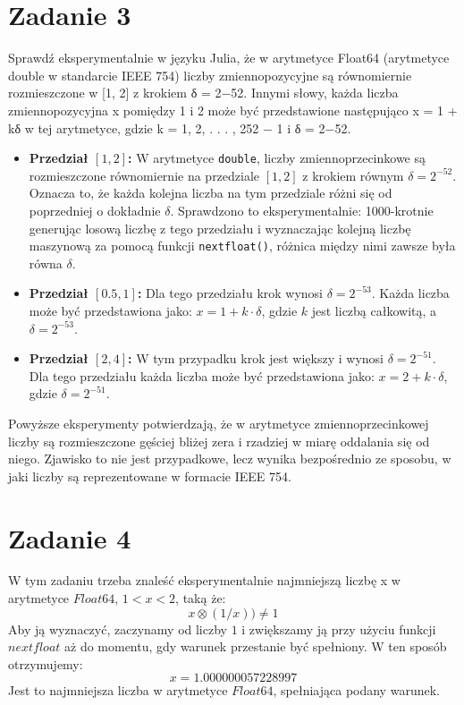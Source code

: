 \documentclass{article}
\begin{document}
\section*{Zadanie 3}

Sprawdź eksperymentalnie w języku Julia, że w arytmetyce Float64 (arytmetyce double
w standarcie IEEE 754) liczby zmiennopozycyjne są równomiernie rozmieszczone w [1, 2] z
krokiem δ = 2−52. Innymi słowy, każda liczba zmiennopozycyjna x pomiędzy 1 i 2 może
być przedstawione następująco x = 1 + kδ w tej arytmetyce, gdzie k = 1, 2, . . . , 252 − 1 i
δ = 2−52.

\begin{itemize}
    \item \textbf{Przedział \([1, 2]\):} W arytmetyce \texttt{double}, liczby zmiennoprzecinkowe są rozmieszczone równomiernie na przedziale \([1, 2]\) z krokiem równym $\delta = 2^{-52}$. Oznacza to, że każda kolejna liczba na tym przedziale różni się od poprzedniej o dokładnie $\delta$. Sprawdzono to eksperymentalnie: 1000-krotnie generując losową liczbę z tego przedziału i wyznaczając kolejną liczbę maszynową za pomocą funkcji \texttt{nextfloat()}, różnica między nimi zawsze była równa $\delta$.

    \item \textbf{Przedział \([0.5, 1]\):} Dla tego przedziału krok wynosi $\delta = 2^{-53}$. Każda liczba może być przedstawiona jako: $x = 1 + k \cdot \delta$, gdzie $k$ jest liczbą całkowitą, a $\delta = 2^{-53}$.

    \item \textbf{Przedział \([2, 4]\):} W tym przypadku krok jest większy i wynosi $\delta = 2^{-51}$. Dla tego przedziału każda liczba może być przedstawiona jako: $x = 2 + k \cdot \delta$, gdzie $\delta = 2^{-51}$.
\end{itemize}

Powyższe eksperymenty potwierdzają, że w arytmetyce zmiennoprzecinkowej liczby są rozmieszczone gęściej bliżej zera i rzadziej w miarę oddalania się od niego. Zjawisko to nie jest przypadkowe, lecz wynika bezpośrednio ze sposobu, w jaki liczby są reprezentowane w formacie IEEE 754.
\section*{Zadanie 4}
W tym zadaniu trzeba znaleść eksperymentalnie najmniejszą liczbę x w arytmetyce $Float64$, $1<x<2$, taką że:
\[
    x \otimes (1/x)) \neq 1
\]
Aby ją wyznaczyć, zaczynamy od liczby $1$ i zwiększamy ją przy użyciu funkcji $nextfloat$ aż do momentu, gdy warunek przestanie być spełniony. W ten sposób otrzymujemy:
\[
    x = 1.000000057228997
\]
Jest to najmniejsza liczba w arytmetyce $Float64$, spełniająca podany warunek.
\end{document}
